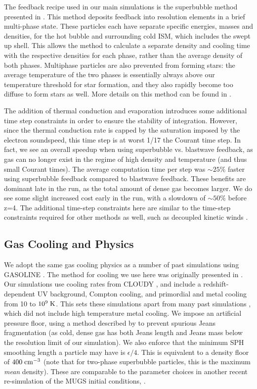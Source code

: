 The feedback recipe used in our main simulations is the superbubble method
presented in \citet{Keller2014}.  This method deposits feedback into resolution
elements in a brief multi-phase state.  These particles each have separate
specific energies, masses and densities, for the hot bubble and surrounding cold
ISM, which includes the swept up shell.  This allows the method to calculate a
separate density and cooling time with the respective densities for each phase,
rather than the average density of both phases.  Multiphase particles are also
prevented from forming stars: the average temperature of the two phases is
essentially always above our temperature threshold for star formation, and they
also rapidly become too diffuse to form stars as well.  More
details on this method can be found in \citet{Keller2014}.

The addition of thermal conduction and evaporation introduces some additional
time step constraints in order to ensure the stability of integration.  However,
since the thermal conduction rate is capped by the saturation imposed by the
electron soundspeed, this time step is at worst 1/17 the Courant time step. In
fact, we see an overall speedup when using superbubble vs. blastwave feedback,
as gas can no longer exist in the regime of high density and temperature (and
thus small Courant times).  The average computation time per step was $\sim
25\%$ faster using superbubble feedback compared to blastwave feedback.  These
benefits are dominant late in the run, as the total amount of dense gas becomes
larger. We do see some slight increased cost early in the run, with a slowdown
of $\sim50\%$ before z=4.  The additional time-step constraints here are similar
to the time-step constraints required for other methods as well, such as
decoupled kinetic winds \citep{Springel2003}.


\subsection{Gas Cooling and Physics}
We adopt the same gas cooling physics as a number of past simulations using
\textsc{GASOLINE} \citep{Stinson2013,Keller2014}.  The method for cooling we use
here was originally presented in \citet{Shen2010}.  Our simulations use cooling
rates from \textsc{CLOUDY} \citep{Ferland2013}, and  include a
redshift-dependent UV background, Compton cooling, and primordial and metal
cooling from 10 to $10^9\; \rm{K}$.  This sets these simulations apart from many
past simulations \citep{Governato2009,Brook2011,Guedes2011}, which did not
include high temperature metal cooling.  We impose an artificial pressure floor,
using a method described by \citet{Robertson2008} to prevent spurious Jeans
fragmentation (as cold, dense gas has both Jeans length and Jeans mass below the
resolution limit of our simulation).  We also enforce that the minimum SPH
smoothing length a particle may have is $\epsilon/4$.  This is equivalent to a
density floor of $400\; \rm{cm^{-3}}$ (note that for two-phase superbubble
particles, this is the maximum \textit{mean} density).  These are comparable to
the parameter choices in another recent re-simulation of the MUGS initial
conditions, \citet{Stinson2013}.

